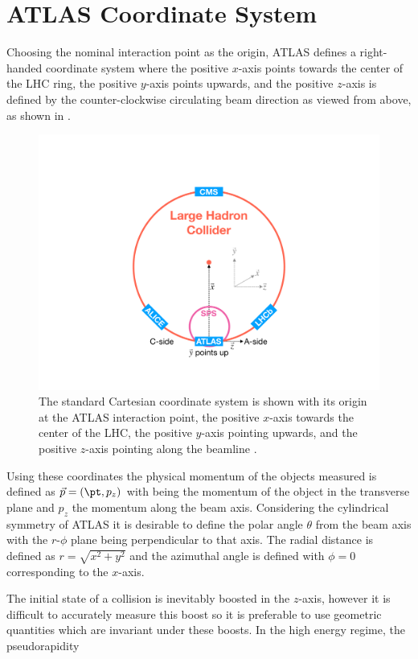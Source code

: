 \section{ATLAS Coordinate System} \label{sec:atlas:coordinates}

Choosing the nominal interaction point as the origin, ATLAS defines a right-handed
coordinate system where the positive $x$-axis points towards the center of the
LHC ring, the positive $y$-axis points upwards, and the positive $z$-axis is
defined by the counter-clockwise circulating beam direction as viewed from
above, as shown in  \cite{PERF-2007-01}.  
 
\begin{figure}[!htbp]
  \begin{center}
    \includegraphics[width=0.7\linewidth]{figures/atlas/atlas_geometry}
    \caption{ The standard Cartesian coordinate system is shown with its origin at
the ATLAS interaction point, the positive $x$-axis towards the center of the
LHC, the positive $y$-axis pointing upwards, and the positive $z$-axis pointing
along the beamline \cite{Feickert:2690521}.}
    \label{fig:atlas_geometry}
  \end{center}
\end{figure}

Using these coordinates the physical momentum of the objects measured is
defined as $\vec{p} = (\pt,p_z)$ with \pt being the momentum of the object in
the transverse plane and $p_z$ the momentum along the beam axis. Considering
the cylindrical symmetry of ATLAS it is desirable to define the polar angle
$\theta$ from the beam axis with the $r$-$\phi$ plane being perpendicular to
that axis.  The radial distance is defined as $r = \sqrt{x^2+y^2}$ and the
azimuthal angle is defined with $\phi = 0$ corresponding to the $x$-axis.

The initial state of a collision is inevitably boosted in the $z$-axis, however
it is difficult to accurately measure this boost so it is preferable to use
geometric quantities which are invariant under these boosts. In the high energy
regime, the pseudorapidity 

